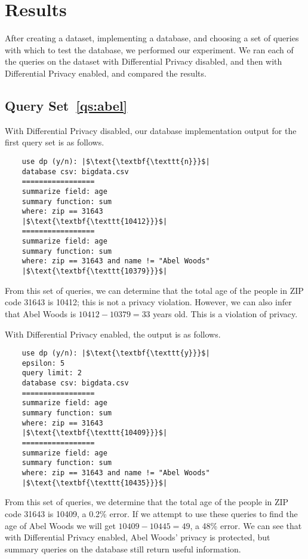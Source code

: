\documentclass[conference,11pt]{IEEEtran}
\begin{document}
\section{Results}\label{sec:results}
After creating a dataset, implementing a database, and choosing a set of queries
with which to test the database, we performed our experiment. We ran each of the
queries on the dataset with Differential Privacy disabled, and then with
Differential Privacy enabled, and compared the results.

\subsection{Query Set~\ref{qs:abel}}

With Differential Privacy disabled, our database implementation output for the
first query set is as follows.
\begin{verbatim}
    use dp (y/n): |$\text{\textbf{\texttt{n}}}$|
    database csv: bigdata.csv
    =================
    summarize field: age
    summary function: sum
    where: zip == 31643
    |$\text{\textbf{\texttt{10412}}}$|
    =================
    summarize field: age
    summary function: sum
    where: zip == 31643 and name != "Abel Woods"
    |$\text{\textbf{\texttt{10379}}}$|
\end{verbatim}
From this set of  queries, we can determine that the total age of the people in
ZIP code 31643 is 10412; this is not a privacy violation. However, we can also
infer that Abel Woods is $10412 - 10379 = 33$ years old. This is a violation of
privacy.

With Differential Privacy enabled, the output is as follows.
\begin{verbatim}
    use dp (y/n): |$\text{\textbf{\texttt{y}}}$|
    epsilon: 5
    query limit: 2
    database csv: bigdata.csv
    =================
    summarize field: age
    summary function: sum
    where: zip == 31643
    |$\text{\textbf{\texttt{10409}}}$|
    =================
    summarize field: age
    summary function: sum
    where: zip == 31643 and name != "Abel Woods"
    |$\text{\textbf{\texttt{10435}}}$|
\end{verbatim}
From this set of queries, we determine that the total age of the people in ZIP
code 31643 is 10409, a 0.2\% error. If we attempt to use these queries to find
the age of Abel Woods we will get $10409 - 10445 = 49$, a 48\% error. We can see
that with Differential Privacy enabled, Abel Woods' privacy is protected, but
summary queries on the database still return useful information.
\end{document}
